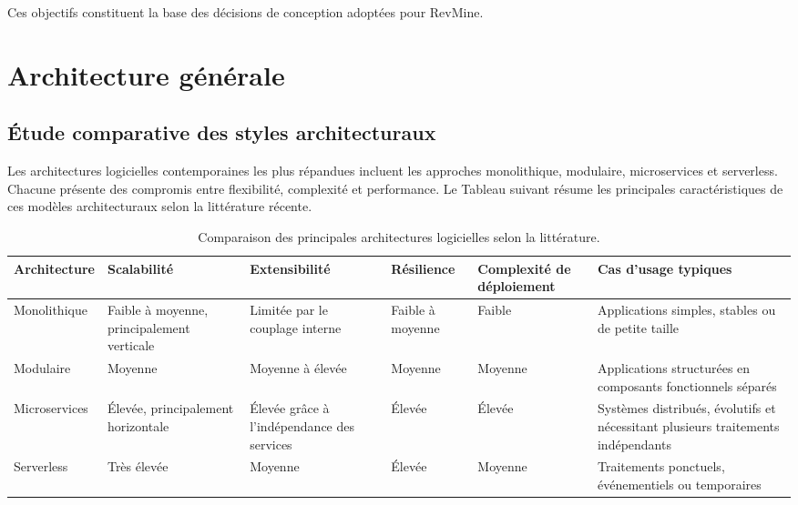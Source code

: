 \vspace{0.5cm}

Ces objectifs constituent la base des décisions de conception adoptées pour RevMine.


\section{Architecture générale}
\subsection{Étude comparative des styles architecturaux}

Les architectures logicielles contemporaines les plus répandues incluent les approches monolithique, modulaire, microservices et serverless. Chacune présente des compromis entre flexibilité, complexité et performance. Le Tableau suivant résume les principales caractéristiques de ces modèles architecturaux selon la littérature récente.



\begin{table}[H]
\centering
\small
\begin{tabularx}{\textwidth}{|l|Y|Y|Y|Y|Y|}
\hline
\textbf{Architecture} & \textbf{Scalabilité} & \textbf{Extensibilité} & \textbf{Résilience} & \textbf{Complexité de déploiement} & \textbf{Cas d’usage typiques} \\
\hline
Monolithique & Faible à moyenne, principalement verticale & Limitée par le couplage interne & Faible à moyenne & Faible & Applications simples, stables ou de petite taille \\
\hline
Modulaire & Moyenne & Moyenne à élevée & Moyenne & Moyenne & Applications structurées en composants fonctionnels séparés \\
\hline
Microservices & Élevée, principalement horizontale & Élevée grâce à l’indépendance des services & Élevée & Élevée & Systèmes distribués, évolutifs et nécessitant plusieurs traitements indépendants \\
\hline
Serverless & Très élevée & Moyenne & Élevée & Moyenne & Traitements ponctuels, événementiels ou temporaires\\
\hline
\end{tabularx}
\caption{Comparaison des principales architectures logicielles selon la littérature.}
\label{tab:comparaison_architectures}
\end{table}

